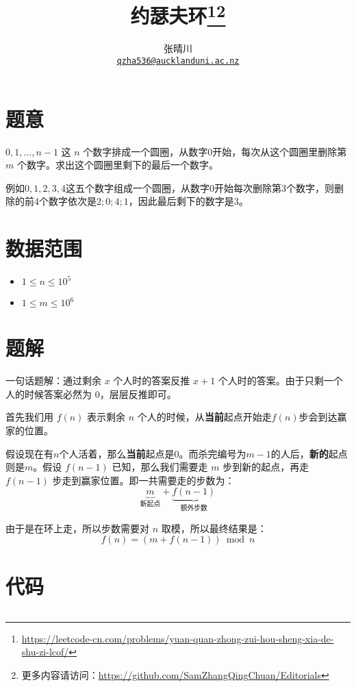 \documentclass{article}
\title{约瑟夫环\footnote{\url{https://leetcode-cn.com/problems/yuan-quan-zhong-zui-hou-sheng-xia-de-shu-zi-lcof/}}\footnote{更多内容请访问：\url{https://github.com/SamZhangQingChuan/Editorials}}}
\author{张晴川\\\href{mailto:qzha536@aucklanduni.ac.nz}{\texttt{qzha536@aucklanduni.ac.nz}}}
\begin{document}
\maketitle
\section{题意}
$0,1,\ldots,n-1$ 这 $n$ 个数字排成一个圆圈，从数字$0$开始，每次从这个圆圈里删除第 $m$ 个数字。求出这个圆圈里剩下的最后一个数字。

例如$0, 1, 2, 3, 4$这五个数字组成一个圆圈，从数字$0$开始每次删除第$3$个数字，则删除的前$4$个数字依次是$2;0;4;1$，因此最后剩下的数字是$3$。


\section{数据范围}
\begin{itemize}
\item $1 \le n \le 10^5$
\item $1 \le m \le 10^6$
\end{itemize}


\section{题解}

一句话题解：通过剩余 $x$ 个人时的答案反推 $x+1$ 个人时的答案。由于只剩一个人的时候答案必然为 $0$，层层反推即可。


首先我们用 $f(n)$ 表示剩余 $n$ 个人的时候，从\textbf{当前}起点开始走$f(n)$步会到达赢家的位置。


假设现在有$n$个人活着，那么\textbf{当前}起点是$0$。而杀完编号为$m-1$的人后，\textbf{新的}起点则是$m$。假设 $f(n-1)$ 已知，那么我们需要走 $m$ 步到新的起点，再走 $f(n-1)$ 步走到赢家位置。即一共需要走的步数为： 
$$
\underbrace{m}_{\text{新起点}} + \underbrace{f(n-1)}_{\text{额外步数}}
$$

由于是在环上走，所以步数需要对 $n$ 取模，所以最终结果是：
$$
f(n) = (m + f(n-1)) \bmod {n}
$$


\section{代码}
\inputminted[linenos,autogobble]{cpp}{Josephus.cpp}
\end{document}
